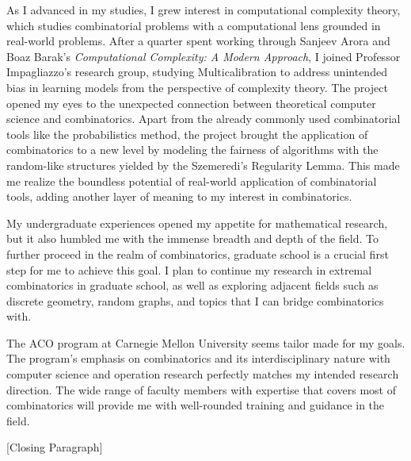 \documentclass[12pt]{article}
\begin{document}
As I advanced in my studies, I grew interest in computational complexity theory, which studies
combinatorial problems with a computational lens grounded in real-world problems. After a quarter
spent working through Sanjeev Arora and Boaz Barak's \textit{Computational Complexity: A Modern
Approach}, I joined Professor Impagliazzo's research group, studying Multicalibration to address
unintended bias in learning models from the perspective of complexity theory. The project opened my
eyes to the unexpected connection between theoretical computer science and combinatorics. Apart from
the already commonly used combinatorial tools like the probabilistics method, the project brought
the application of combinatorics to a new level by modeling the fairness of algorithms with the
random-like structures yielded by the Szemeredi's Regularity Lemma. This made me realize the
boundless potential of real-world application of combinatorial tools, adding another layer of
meaning to my interest in combinatorics.

My undergraduate experiences opened my appetite for mathematical research, but it also humbled me
with the immense breadth and depth of the field. To further proceed in the realm of combinatorics,
graduate school is a crucial first step for me to achieve this goal. I plan to continue my research
in extremal combinatorics in graduate school, as well as exploring adjacent fields such as discrete
geometry, random graphs, and topics that I can bridge combinatorics with.

The ACO program at Carnegie Mellon University seems tailor made for my goals. The program's emphasis
on combinatorics and its interdisciplinary nature with computer science and operation research
perfectly matches my intended research direction. The wide range of faculty members with expertise
that covers most of combinatorics will provide me with well-rounded training and guidance in the
field. 

[Closing Paragraph]
\end{document}
